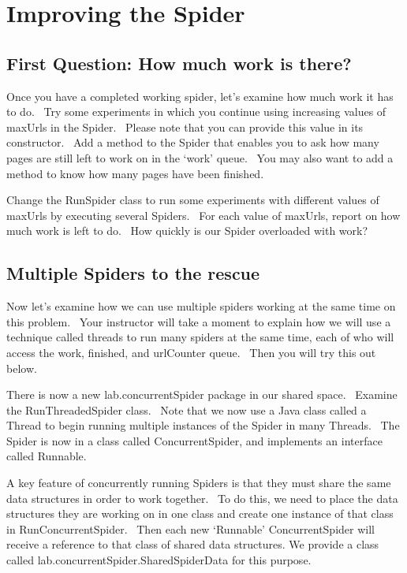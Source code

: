 \documentclass[letterpaper,10pt,openany,oneside]{sphinxmanual}
\begin{document}
\chapter{Improving the Spider}
\label{SpiderLabpart2/SpiderLabpart2:improving-the-spider}\label{SpiderLabpart2/SpiderLabpart2::doc}

\section{First Question: How much work is there?}
\label{SpiderLabpart2/SpiderLabpart2:first-question-how-much-work-is-there}
Once you have a completed working spider, let’s examine how much
work it has to do.  Try some experiments in which you continue
using increasing values of maxUrls in the Spider.  Please note that
you can provide this value in its constructor.  Add a method to the
Spider that enables you to ask how many pages are still left to
work on in the ‘work’ queue.  You may also want to add a method to
know how many pages have been finished.

Change the RunSpider class to run some experiments with different
values of maxUrls by executing several Spiders.  For each value of
maxUrls, report on how much work is left to do.  How quickly is our
Spider overloaded with work?


\section{Multiple Spiders to the rescue}
\label{SpiderLabpart2/SpiderLabpart2:multiple-spiders-to-the-rescue}
Now let’s examine how we can use multiple spiders working at the
same time on this problem.  Your instructor will take a moment to
explain how we will use a technique called threads to run many
spiders at the same time, each of who will access the work,
finished, and urlCounter queue.  Then you will try this out below.

There is now a new lab.concurrentSpider package in our shared
space.  Examine the RunThreadedSpider class.  Note that we now use
a Java class called a Thread to begin running multiple instances of
the Spider in many Threads.  The Spider is now in a class called
ConcurrentSpider, and implements an interface called Runnable.

A key feature of concurrently running Spiders is that they must
share the same data structures in order to work together.  To do
this, we need to place the data structures they are working on in
one class and create one instance of that class in
RunConcurrentSpider.  Then each new ‘Runnable’ ConcurrentSpider
will receive a reference to that class of shared data structures.
We provide a class called lab.concurrentSpider.SharedSpiderData for this purpose.
\end{document}

